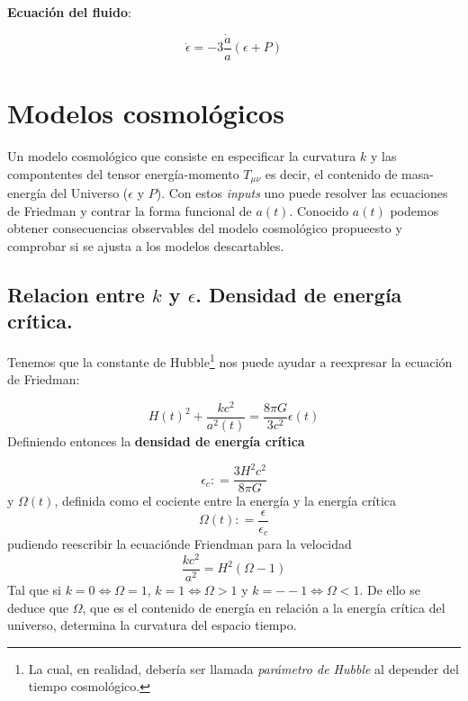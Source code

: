 \begin{Resaltar}
	\begin{center}
		\textbf{Ecuación del fluido}:
	\end{center}
	\begin{equation}
		\dot{\epsilon} = - 3 \frac{\dot{a}}{a} (\epsilon + P)
	\end{equation}
\end{Resaltar}


\section{Modelos cosmológicos}

Un modelo cosmológico que consiste en especificar la curvatura $k$ y las compontentes del tensor energía-momento $T_{\mu \nu}$ es decir, el contenido de masa-energía del Universo ($\epsilon$ y $P$). Con estos \textit{inputs} uno puede resolver las ecuaciones de Friedman y contrar la forma funcional de $a(t)$. Conocido $a(t)$ podemos obtener consecuencias observables del modelo cosmológico propueesto y comprobar si se ajusta a los modelos descartables.

\subsection{Relacion entre $k$ y $\epsilon$. Densidad de energía crítica.}

Tenemos que la constante de Hubble\footnote{La cual, en realidad, debería ser llamada \textit{parámetro de Hubble} al depender del tiempo cosmológico.} nos puede ayudar a reexpresar la ecuación de Friedman:

\begin{equation}
	H(t)^2 + \frac{kc^2}{a^2(t)} = \frac{8 \pi G}{3c^2} \epsilon (t)
\end{equation}
Definiendo entonces la \textbf{densidad de energía crítica}

\begin{equation}
	\epsilon_c : = \frac{3H^2c^2}{8 \pi G}
\end{equation}
y $\Omega(t)$, definida como el cociente entre la energía y la energía crítica
\begin{equation}
	\Omega(t) : = \frac{\epsilon}{\epsilon_c}
\end{equation}
pudiendo reescribir la ecuaciónde Friendman para la velocidad
\begin{equation}
	\frac{kc^2}{a^2} = H^2(\Omega -1)
\end{equation}
Tal que si $k=0 \Leftrightarrow \Omega = 1$, $k=1 \Leftrightarrow \Omega > 1$ y $k=--1 \Leftrightarrow \Omega < 1$. De ello se deduce que $\Omega$, que es el contenido de energía en relación a la energía crítica del universo, determina la curvatura del espacio tiempo.

